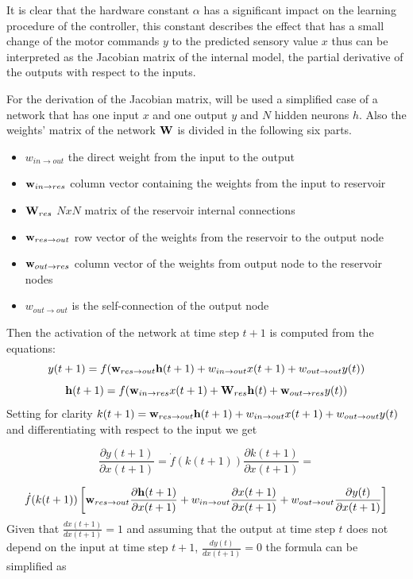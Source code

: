 \documentclass[msc,ai,logo]{infthesis}
\begin{document}
It is clear that the hardware constant $\alpha$ has a significant impact on the learning procedure of the controller, this constant describes the effect that has a small change of the motor commands $y$ to the predicted sensory value $x$ thus can be interpreted as the Jacobian matrix of the internal model, the partial derivative of the outputs with respect to the inputs.

For the derivation of the Jacobian matrix, will be used a simplified case of a network that has one input $x$ and one output $y$ and $N$ hidden neurons $h$. Also the weights' matrix of the network $\bf{W}$ is divided in the following six parts.
\begin{itemize}
\item ${{w_{in \to out}}}$ the direct weight from the input to the output
\item ${{{\bf{w}}_{in \to res}}}$ column vector containing the weights from the input to reservoir
\item ${{{\bf{W}}_{res}}}$   $NxN$ matrix of the reservoir internal connections
\item ${{{\bf{w}}_{res \to out}}}$ row vector of the weights from the reservoir to the output node
\item ${{{\bf{w}}_{out \to res}}}$  column vector of the weights from output node to the reservoir nodes 
\item  ${{w_{out \to out}}}$ is the self-connection of the output node
\end{itemize}
Then the activation of the network at time step $t+1$ is computed from the equations:
\begin{equation}
y(t + 1) = f({{\bf{w}}_{res \to out}}{\bf{h}}(t + 1) + {w_{in \to out}}x(t + 1) + {w_{out \to out}}y(t))
\end{equation}
\begin{equation}
{\bf{h}}(t + 1) = f({{\bf{w}}_{in \to res}}x(t + 1) + {{\bf{W}}_{res}}{\bf{h}}(t) + {{\bf{w}}_{out \to res}}y(t))
\end{equation}
Setting for clarity $k(t+1)={{{\bf{w}}_{res \to out}}{\bf{h}}(t + 1) + {w_{in \to out}}x(t + 1) + {w_{out \to out}}y(t)}$ and differentiating with respect to the input we get

\[\frac{{\partial y(t + 1)}}{{\partial x(t + 1)}} = \dot f(k(t + 1))\frac{{\partial k(t + 1)}}{{\partial x(t + 1)}} = \]

\[\dot f(k(t + 1))\left[ {{{\bf{w}}_{res \to out}}\frac{{\partial {\bf{h}}(t + 1)}}{{\partial x(t + 1)}} + {w_{in \to out}}\frac{{\partial x(t + 1)}}{{\partial x(t + 1)}} + {w_{out \to out}}\frac{{\partial y(t)}}{{\partial x(t + 1)}}} \right]\]
Given that ${\frac{{dx(t + 1)}}{{dx(t + 1)}}} =1 $ and assuming that the output at time step $t$ does not depend on the input at time step $t+1$, ${\frac{{dy(t )}}{{dx(t + 1)}}} =0 $ the formula can be simplified as
\end{document}
